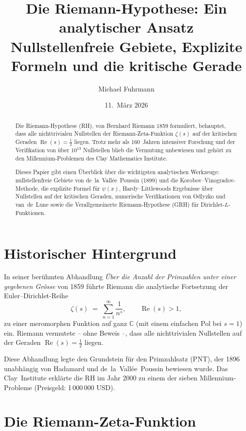 \documentclass[12pt,a4paper]{article}
\title{\textbf{Die Riemann-Hypothese: Ein analytischer Ansatz}\\[0.5em]
\large Nullstellenfreie Gebiete, Explizite Formeln und die kritische Gerade}
\author{Michael Fuhrmann}
\date{11.\ März 2026}
\theoremstyle{remark}
\begin{document}
\maketitle
\begin{abstract}
Die Riemann-Hypothese (RH), von Bernhard Riemann 1859 formuliert, behauptet, dass alle
nichttrivialen Nullstellen der Riemann-Zeta-Funktion $\zeta(s)$ auf der kritischen Geraden
$\operatorname{Re}(s)=\tfrac{1}{2}$ liegen.  Trotz mehr als 160~Jahren intensiver Forschung
und der Verifikation von über $10^{13}$ Nullstellen blieb die Vermutung unbewiesen und
gehört zu den Millennium-Problemen des Clay Mathematics Institute.

Dieses Papier gibt einen Überblick über die wichtigsten analytischen Werkzeuge:
nullstellenfreie Gebiete von de~la~Vallée~Poussin (1899) und die
Korobov--Vinogradov-Methode, die explizite Formel für $\psi(x)$, Hardy--Littlewoo\-ds
Ergebnisse über Nullstellen auf der kritischen Geraden, numerische Verifikationen von
Odlyzko und van~de~Lune sowie die Verallgemeinerte Riemann-Hypothese (GRH) für
Dirichlet-$L$-Funktionen.
\end{abstract}

\tableofcontents
\newpage

\section{Historischer Hintergrund}

In seiner berühmten Abhandlung \textit{Über die Anzahl der Primzahlen unter einer gegebenen
Grösse} von 1859 führte Riemann die analytische Fortsetzung der Euler--Dirichlet-Reihe
\[
  \zeta(s) \;=\; \sum_{n=1}^{\infty} \frac{1}{n^s}, \qquad \operatorname{Re}(s) > 1,
\]
zu einer meromorphen Funktion auf ganz $\mathbb{C}$ (mit einem einfachen Pol bei $s=1$) ein.
Riemann vermutete – ohne Beweis –, dass alle nichttrivialen Nullstellen auf der Geraden
$\operatorname{Re}(s)=\tfrac{1}{2}$ liegen.

Diese Abhandlung legte den Grundstein für den Primzahlsatz (PNT), der 1896 unabhängig von
Hadamard und de~la~Vallée~Poussin bewiesen wurde.  Das Clay~Institute erklärte die RH im
Jahr 2000 zu einem der sieben Millennium-Probleme (Preisgeld: 1\,000\,000 USD).

\section{Die Riemann-Zeta-Funktion}
\end{document}

